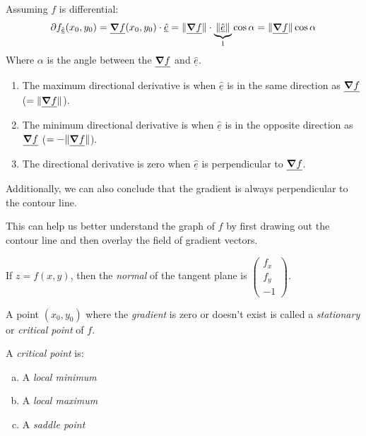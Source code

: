 \documentclass[00_complete]{subfiles}
\begin{document}
Assuming $f$ is differential:
\begin{gather*}
    \partial f_{\hat{\underline e}}(x_0,y_0)=\underline{\grad f}(x_0,y_0)\cdot
    \underline{\hat e} = \|\underline{\grad f}\|\cdot \underbrace{\|\hat{\underline
    e}\|}_{1}\cos \alpha = \|\underline {\grad f}\|\cos \alpha
\end{gather*}
Where $\alpha$ is the angle between the $\underline{\grad f}$ and $\hat{\underline
e}$.
\begin{conclusion}
    \begin{enumerate}
    \item The maximum directional derivative is when $\hat{\underline
    e}$ is in the same direction as $\underline{\grad f}$
    ($=\|\underline{\grad f}\|$).
    \item The minimum directional derivative is when $\hat{\underline
    e}$ is in the opposite direction as $\underline{\grad f}$
    ($=-\|\underline{\grad f}\|$).
    \item The directional derivative is zero when $\hat{\underline
    e}$ is perpendicular to $\underline{\grad f}$.
    \end{enumerate}
    Additionally, we can also conclude that the gradient is always
    perpendicular to the contour line.
\end{conclusion}
This can help us better understand the graph of $f$ by first drawing out the
contour line and then overlay the field of gradient vectors.
\begin{note}
    If $z=f(x,y)$, then the \emph{normal} of the tangent plane is
    $\begin{pmatrix}
        f_x\\f_y\\-1
    \end{pmatrix}$.
\end{note}
\begin{definition}
    A point $(x_0,y_0)$ where the \emph{gradient} is zero or doesn't exist is
    called a \emph{stationary} or \emph{critical point} of $f$.

    A \emph{critical point} is:
    \begin{enumerate}[a.] \tightlist
        \item A \emph{local minimum}
        \item A \emph{local maximum}
        \item A \emph{saddle point}
    \end{enumerate}
\end{definition}
\end{document}
